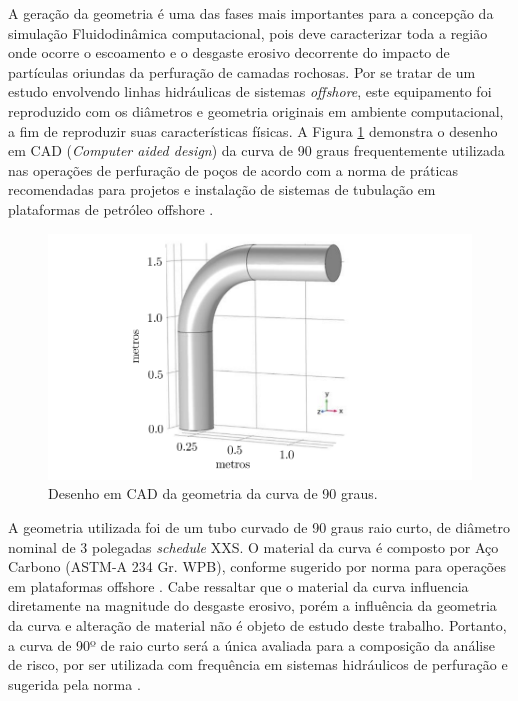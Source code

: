 A geração da geometria é uma das fases mais importantes para a concepção da simulação Fluidodinâmica computacional, pois deve caracterizar toda a região onde ocorre o escoamento e o desgaste erosivo decorrente do impacto de partículas oriundas da perfuração de camadas rochosas. Por se tratar de um estudo envolvendo linhas hidráulicas de sistemas \textit{offshore}, este equipamento foi reproduzido com os diâmetros e geometria originais em ambiente computacional, a fim de reproduzir suas características físicas. A Figura \ref{fig:cfdgeometria} demonstra o desenho em CAD (\textit{Computer aided design}) da curva de 90 graus frequentemente utilizada nas operações de perfuração de poços de acordo com a norma de práticas recomendadas para projetos e instalação de sistemas de tubulação em plataformas de petróleo offshore \cite{api14e}. 

\begin{figure}[H] 
    \centering  
    \includegraphics[width=1\textwidth]{Figuras/cfdegeometria.pdf}
    \caption{Desenho em CAD da geometria da curva de 90 graus.}  
    \label{fig:cfdgeometria}  
\end{figure}

\vspace{0.2cm}

A geometria utilizada foi de um tubo curvado de 90 graus raio
curto, de diâmetro nominal de 3 polegadas \textit{schedule} XXS. O material da curva é composto por Aço Carbono (ASTM-A 234 Gr. WPB), conforme sugerido por norma para operações em plataformas offshore \cite{api14e}. Cabe ressaltar que o material da curva influencia diretamente na magnitude do desgaste erosivo, porém a influência da geometria da curva e alteração de material não é objeto de estudo deste trabalho. Portanto, a curva de 90º de raio curto será a única avaliada para a composição da análise de risco, por ser utilizada com frequência em sistemas hidráulicos de perfuração e sugerida pela norma \cite{api14e}.

